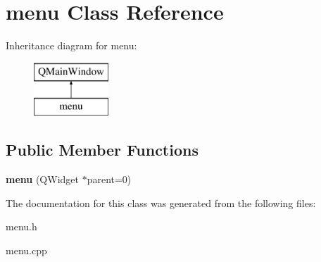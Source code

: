 \hypertarget{classmenu}{}\section{menu Class Reference}
\label{classmenu}
Inheritance diagram for menu\+:\begin{figure}[H]
\begin{center}
\leavevmode
\includegraphics[height=2.000000cm]{classmenu}
\end{center}
\end{figure}
\subsection*{Public Member Functions}
\begin{DoxyCompactItemize}
\item 
\hypertarget{classmenu_aff7946ea9349eacaede63417ecea19cc}{}{\bfseries menu} (Q\+Widget $\ast$parent=0)\label{classmenu_aff7946ea9349eacaede63417ecea19cc}

\end{DoxyCompactItemize}


The documentation for this class was generated from the following files\+:\begin{DoxyCompactItemize}
\item 
menu.\+h\item 
menu.\+cpp\end{DoxyCompactItemize}
